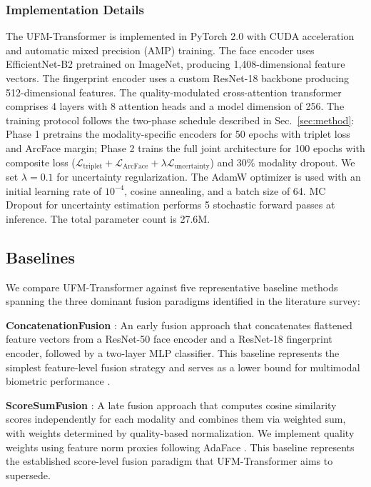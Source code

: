 \documentclass[10pt,journal,compsoc]{IEEEtran}
\begin{document}
\subsubsection{Implementation Details} The UFM-Transformer is implemented in PyTorch 2.0 with CUDA acceleration and automatic mixed precision (AMP) training. The face encoder uses EfficientNet-B2 pretrained on ImageNet, producing 1,408-dimensional feature vectors. The fingerprint encoder uses a custom ResNet-18 backbone producing 512-dimensional features. The quality-modulated cross-attention transformer comprises 4 layers with 8 attention heads and a model dimension of 256. The training protocol follows the two-phase schedule described in Sec.~\ref{sec:method}: Phase 1 pretrains the modality-specific encoders for 50 epochs with triplet loss and ArcFace margin; Phase 2 trains the full joint architecture for 100 epochs with composite loss ($\mathcal{L}_{\text{triplet}} + \mathcal{L}_{\text{ArcFace}} + \lambda \mathcal{L}_{\text{uncertainty}}$) and 30\% modality dropout. We set $\lambda = 0.1$ for uncertainty regularization. The AdamW optimizer is used with an initial learning rate of $10^{-4}$, cosine annealing, and a batch size of 64. MC Dropout for uncertainty estimation performs 5 stochastic forward passes at inference. The total parameter count is 27.6M.

\subsection{Baselines}
\label{subsec:baselines}

We compare UFM-Transformer against five representative baseline methods spanning the three dominant fusion paradigms identified in the literature survey:

\textbf{ConcatenationFusion} \cite{alay2020multimodal}: An early fusion approach that concatenates flattened feature vectors from a ResNet-50 face encoder and a ResNet-18 fingerprint encoder, followed by a two-layer MLP classifier. This baseline represents the simplest feature-level fusion strategy and serves as a lower bound for multimodal biometric performance \cite{liang2024fusion}.

\textbf{ScoreSumFusion} \cite{nandakumar2008fusion}: A late fusion approach that computes cosine similarity scores independently for each modality and combines them via weighted sum, with weights determined by quality-based normalization. We implement quality weights using feature norm proxies following AdaFace \cite{kim2022adaface}. This baseline represents the established score-level fusion paradigm that UFM-Transformer aims to supersede.
\end{document}
